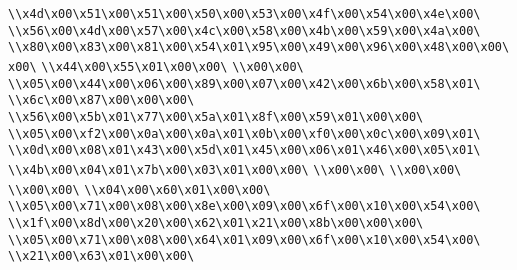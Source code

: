 \verb|\\x4d\x00\x51\x00\x51\x00\x50\x00\x53\x00\x4f\x00\x54\x00\x4e\x00\|\newline
\verb|\\x56\x00\x4d\x00\x57\x00\x4c\x00\x58\x00\x4b\x00\x59\x00\x4a\x00\|\newline
\verb|\\x80\x00\x83\x00\x81\x00\x54\x01\x95\x00\x49\x00\x96\x00\x48\x00\x00\x00\|\newline
\verb|\\x44\x00\x55\x01\x00\x00\|\newline
\verb|\\x00\x00\|\newline
\verb|\\x05\x00\x44\x00\x06\x00\x89\x00\x07\x00\x42\x00\x6b\x00\x58\x01\|\newline
\verb|\\x6c\x00\x87\x00\x00\x00\|\newline
\verb|\\x56\x00\x5b\x01\x77\x00\x5a\x01\x8f\x00\x59\x01\x00\x00\|\newline
\verb|\\x05\x00\xf2\x00\x0a\x00\x0a\x01\x0b\x00\xf0\x00\x0c\x00\x09\x01\|\newline
\verb|\\x0d\x00\x08\x01\x43\x00\x5d\x01\x45\x00\x06\x01\x46\x00\x05\x01\|\newline
\verb|\\x4b\x00\x04\x01\x7b\x00\x03\x01\x00\x00\|\newline
\verb|\\x00\x00\|\newline
\verb|\\x00\x00\|\newline
\verb|\\x00\x00\|\newline
\verb|\\x04\x00\x60\x01\x00\x00\|\newline
\verb|\\x05\x00\x71\x00\x08\x00\x8e\x00\x09\x00\x6f\x00\x10\x00\x54\x00\|\newline
\verb|\\x1f\x00\x8d\x00\x20\x00\x62\x01\x21\x00\x8b\x00\x00\x00\|\newline
\verb|\\x05\x00\x71\x00\x08\x00\x64\x01\x09\x00\x6f\x00\x10\x00\x54\x00\|\newline
\verb|\\x21\x00\x63\x01\x00\x00\|\newline
